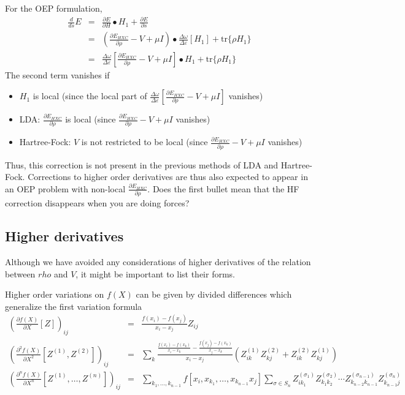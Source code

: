 \documentclass{article}
\newcommand{\beas}{\begin{eqnarray*}}
\newcommand{\enas}{\end{eqnarray*}}
\newcommand{\trace}{\mbox{tr}} \newcommand{\real}{\mathcal Re}
\newcommand{\Vscp}{V}
\newcommand{\Red}{\color{red}}
\begin{document}
For the OEP formulation,
\beas
\frac{d}{ds} E &=&
         \frac{\partial E}{\partial H} \bullet H_1+
          \frac{\partial E}{\partial s}\\
 &=&
      \left( \frac{\partial E_{HXC}}{\partial \rho} - \Vscp + \mu I \right)
      \bullet       \frac{\Delta \omega}{\Delta \varepsilon}
      \left[H_1\right]+ \trace\{\rho H_1\}\\
 &=&
      \frac{\Delta \omega}{\Delta \varepsilon}
      \left[ \frac{\partial E_{HXC}}{\partial \rho} - \Vscp + \mu I \right]
      \bullet H_1+ \trace\{\rho H_1\}
\enas
The second term vanishes if
\begin{itemize}
\item $H_1$ is local (since the local part of 
$\frac{\Delta \omega}{\Delta \varepsilon}
      \left[ \frac{\partial E_{HXC}}{\partial \rho} - \Vscp + \mu I \right]$
vanishes)
\item LDA: $\frac{\partial E_{HXC}}{\partial \rho}$ is local
(since $\frac{\partial E_{HXC}}{\partial \rho} - \Vscp + \mu I$ vanishes)
\item Hartree-Fock: $\Vscp$ is not restricted to be local
(since $\frac{\partial E_{HXC}}{\partial \rho} - \Vscp + \mu I$ vanishes)
\end{itemize}
Thus, this correction is not present in the previous methods of
LDA and Hartree-Fock.  Corrections to higher order derivatives are
thus also expected to appear in an OEP problem with non-local
$\frac{\partial E_{HXC}}{\partial \rho}$.
{\Red Does the first bullet mean that the HF correction disappears
when you are doing forces?}

\subsection{Higher derivatives}

Although we have avoided any considerations of higher derivatives of
the relation between $rho$ and $\Vscp$, it might be important to
list their forms.

Higher order variations on $f(X)$ can be given by divided differences
which generalize the first variation formula
\beas
\left(\frac{\partial f(X)}{\partial X}\left[Z\right]\right)_{ij}
 &=&
  \frac{f(x_{i}) - f(x_{j})}{x_{i}-x_{j}} Z_{ij}\\
\left(\frac{\partial^2 f(X)}{\partial X^2}\left[Z^{(1)},Z^{(2)}\right]\right)_{ij}
 &=&
  \sum_k \frac{
  \frac{f(x_{i}) - f(x_{k})}{x_{i}-x_{k}}
  -\frac{f(x_{j}) - f(x_{k})}{x_{j}-x_{k}}
  }
       {x_{i}-x_{j}}
 \left(Z^{(1)}_{ik} Z^{(2)}_{kj}+Z^{(2)}_{ik} Z^{(1)}_{kj}\right)\\
\left(\frac{\partial^n f(X)}{\partial X^n}\left[Z^{(1)},\ldots,Z^{(n)}\right]\right)_{ij}
 &=&
 \sum_{k_1,\ldots,k_{n-1}} f[x_{i},x_{k_1},\ldots,x_{k_{n-1}}
                                 x_{j}]
 \sum_{\sigma \in S_n} 
  Z^{(\sigma_1)}_{ik_1} Z^{(\sigma_2)}_{k_1k_2} \cdots Z^{(\sigma_{n-1})}_{k_{n-2}k_{n-1}} Z^{(\sigma_n)}_{k_{n-1}j}
\enas
\end{document}
